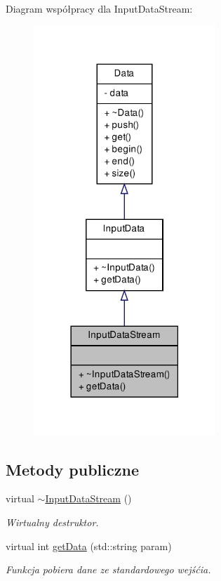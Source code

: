 \-Diagram współpracy dla \-Input\-Data\-Stream\-:\nopagebreak
\begin{figure}[H]
\begin{center}
\leavevmode
\includegraphics[width=194pt]{class_input_data_stream__coll__graph}
\end{center}
\end{figure}
\subsection*{\-Metody publiczne}
\begin{DoxyCompactItemize}
\item 
virtual \hyperlink{class_input_data_stream_a5b404bd725e8792556832c06472d2fb5}{$\sim$\-Input\-Data\-Stream} ()
\begin{DoxyCompactList}\small\item\em \-Wirtualny destruktor. \end{DoxyCompactList}\item 
virtual int \hyperlink{class_input_data_stream_aa25420a7aa42ed58124728ba30df0f71}{get\-Data} (std\-::string param)
\begin{DoxyCompactList}\small\item\em \-Funkcja pobiera dane ze standardowego wejśćia. \end{DoxyCompactList}\end{DoxyCompactItemize}


